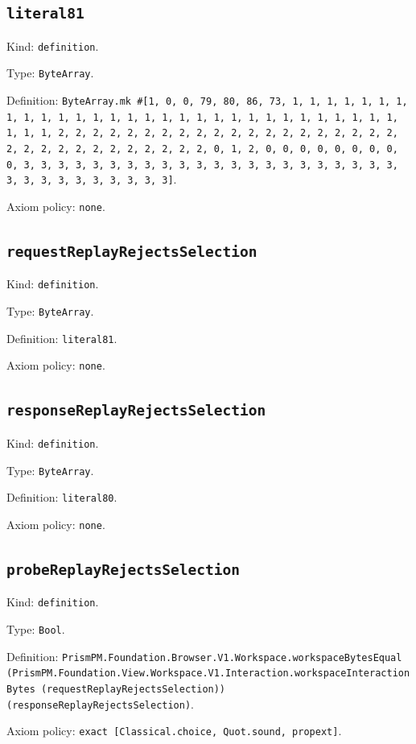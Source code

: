 \documentclass[11pt]{article}
\begin{document}
\subsection*{\texttt{literal81}}
\noindent Kind: \texttt{definition}.\par
\noindent Type: \texttt{ByteArray}.\par
\noindent Definition: \texttt{ByteArray.mk \#[1, 0, 0, 79, 80, 86, 73, 1, 1, 1, 1, 1, 1, 1, 1, 1, 1, 1, 1, 1, 1, 1, 1, 1, 1, 1, 1, 1, 1, 1, 1, 1, 1, 1, 1, 1, 1, 1, 1, 1, 2, 2, 2, 2, 2, 2, 2, 2, 2, 2, 2, 2, 2, 2, 2, 2, 2, 2, 2, 2, 2, 2, 2, 2, 2, 2, 2, 2, 2, 2, 2, 2, 0, 1, 2, 0, 0, 0, 0, 0, 0, 0, 0, 0, 3, 3, 3, 3, 3, 3, 3, 3, 3, 3, 3, 3, 3, 3, 3, 3, 3, 3, 3, 3, 3, 3, 3, 3, 3, 3, 3, 3, 3, 3, 3, 3]}.\par
\noindent Axiom policy: \texttt{none}.\par
\subsection*{\texttt{requestReplayRejectsSelection}}
\noindent Kind: \texttt{definition}.\par
\noindent Type: \texttt{ByteArray}.\par
\noindent Definition: \texttt{literal81}.\par
\noindent Axiom policy: \texttt{none}.\par
\subsection*{\texttt{responseReplayRejectsSelection}}
\noindent Kind: \texttt{definition}.\par
\noindent Type: \texttt{ByteArray}.\par
\noindent Definition: \texttt{literal80}.\par
\noindent Axiom policy: \texttt{none}.\par
\subsection*{\texttt{probeReplayRejectsSelection}}
\noindent Kind: \texttt{definition}.\par
\noindent Type: \texttt{Bool}.\par
\noindent Definition: \texttt{PrismPM.Foundation.Browser.V1.Workspace.workspaceBytesEqual (PrismPM.Foundation.View.Workspace.V1.Interaction.workspaceInteractionBytes (requestReplayRejectsSelection)) (responseReplayRejectsSelection)}.\par
\noindent Axiom policy: \texttt{exact [Classical.choice, Quot.sound, propext]}.\par
\end{document}
